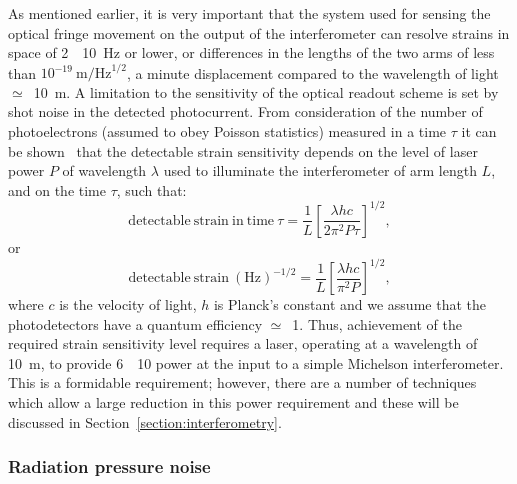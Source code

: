 \documentclass{article}
\newcommand{\Hz}{Hz\super{-1/2}\xspace}
\begin{document}
As mentioned earlier, it is very important that the system used for sensing the
optical fringe movement on the output of the interferometer can resolve strains
in space of 2~\texttimes~10~\Hz or lower, or differences in the
lengths of the two arms of less than $10^{-19} \mathrm{\ m/Hz}^{1/2}$,
a minute displacement compared to the wavelength of light
$\simeq$~10~m. A limitation to the sensitivity of the
optical readout scheme is set by shot noise in the detected photocurrent. From
consideration of the number of photoelectrons (assumed to obey Poisson
statistics) measured in a time $\tau$ it can be shown~\cite{HoughMG5}
that the detectable strain sensitivity depends on the level of laser
power $P$ of wavelength $\lambda$ used to illuminate the
interferometer of arm length $L$, and on the time $\tau$, such that:
%
\begin{equation}
  \mathrm{detectable\ strain\ in\ time\ } \tau = \frac 1{L}\left[\frac{\lambda h
  c}{2 \pi^{2} P \tau}\right]^{1/2},
  \label{equation:shot1}
\end{equation}
%
or
%
\begin{equation}
  \mathrm{detectable\ strain\ }(\mathrm{Hz})^{-1/2} = \frac
  1{L}\left[\frac{\lambda h c}{\pi^{2} P }\right]^{1/2},
  \label{equation:shot2}
\end{equation}
%
where $c$ is the velocity of light, $h$ is Planck's constant and we assume
that the photodetectors have a quantum efficiency $\simeq$~1. Thus, achievement
of the required strain sensitivity level requires a laser, operating at a
wavelength of 10~m, to provide 6~\texttimes~10
power at the input to a simple Michelson interferometer. This is a
formidable requirement; however, there are a number of techniques which
allow a large reduction in this power requirement and these will be
discussed in Section~\ref{section:interferometry}.




\subsubsection{Radiation pressure noise}
\label{subsubsection:radiationnoise}
\end{document}
